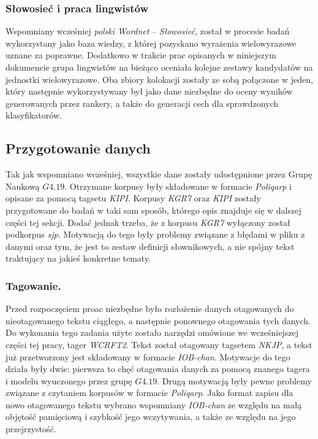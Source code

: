 \documentclass[11pt,a4paper]{llncs}
\begin{document}
\subsubsection{Słowosieć i praca lingwistów}
Wspomniany wcześniej \emph{polski Wordnet} -- \emph{Słowosieć}, został w procesie badań wykorzystany jako baza wiedzy, z której pozyskano wyrażenia wielowyrazowe uznane za poprawne.
Dodatkowo w trakcie prac opisanych w niniejszym dokumencie grupa lingwistów na bieżąco oceniała kolejne zestawy kandydatów na jednostki wielowyrazowe.
Oba zbiory kolokacji zostały ze sobą połączone w jeden, który następnie wykorzystywany był jako dane niezbędne do oceny wyników generowanych przez rankery, a także do generacji cech dla sprawdzonych klasyfikatorów.

\subsection{Przygotowanie danych}

Tak jak wspomniano wcześniej, wszystkie dane zostały udostępnione przez Grupę Naukową $G4.19$.
Otrzymane korpusy były składowane w formacie \emph{Poliqarp} i opisane za pomocą tagsetu \emph{KIPI}.
Korpusy \emph{KGR7} oraz \emph{KIPI} zostały przygotowane do badań w taki sam sposób, którego opis znajduje się w dalszej części tej sekcji.
Dodać jednak trzeba, że z korpusu \emph{KGR7} wyłączony został podkorpus \emph{sjp}.
Motywacją do tego były problemy związane z błędami w pliku z danymi oraz tym, że jest to zestaw definicji słownikowych, a nie spójny tekst traktujący na jakieś konkretne tematy.

\subsubsection{Tagowanie.}

Przed rozpoczęciem proac niezbędne było rozłożenie danych otagowanych do nieotagowanego tekstu ciągłego, a następnie ponownego otagowania tych danych.
Do wykonania tego zadania użyte zostało narzędzi omówione we wcześniejszej części tej pracy, tager \emph{WCRFT2}.
Tekst został otagowany tagsetem \emph{NKJP}, a tekst już przetworzony jest składowany w formacie \emph{IOB-chan}.
Motywacje do tego działa były dwie: pierwsza to chęć otagowania danych za pomocą znanego tagera i modelu wyuczonego przez grupę $G4.19$. 
Drugą motywacją były pewne problemy związane z czytaniem korpusów w formacie \emph{Poliqarp}.
Jako format zapisu dla nowo otagowanego tekstu wybrano wspomniany \emph{IOB-chan} ze względu na małą objętość pamięciową i szybkość jego wczytywania, a także ze względu na jego przejrzystość.
\end{document}
